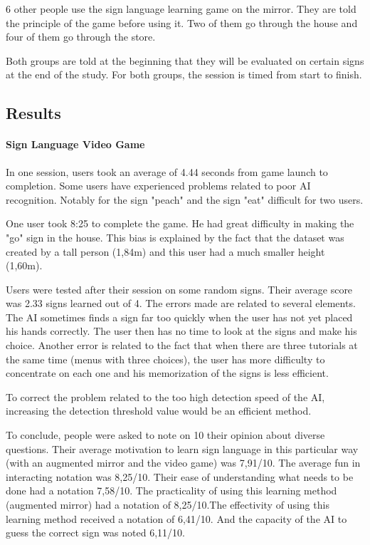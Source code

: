 6 other people use the sign language learning game on the mirror. They are told the principle of the game before using it. Two of them go through the house and four of them go through the store.

Both groups are told at the beginning that they will be evaluated on certain signs at the end of the study. 
For both groups, the session is timed from start to finish.

\subsection{Results}

\paragraph{Sign Language Video Game}

In one session, users took an average of 4.44 seconds from game launch to completion. Some users have experienced problems related to poor AI recognition.
Notably for the sign "peach" and the sign "eat" difficult for two users.

One user took 8:25 to complete the game. He had great difficulty in making the "go" sign in the house. This bias is explained by the fact that the dataset was created by a tall person (1,84m) and this user had a much smaller height (1,60m). 

Users were tested after their session on some random signs. Their average score was 2.33 signs learned out of 4. The errors made are related to several elements. The AI sometimes finds a sign far too quickly when the user has not yet placed his hands correctly. The user then has no time to look at the signs and make his choice. Another error is related to the fact that when there are three tutorials at the same time (menus with three choices), the user has more difficulty to concentrate on each one and his memorization of the signs is less efficient.

To correct the problem related to the too high detection speed of the AI, increasing the detection threshold value would be an efficient method.

To conclude, people were asked to note on 10 their opinion about diverse questions. Their average motivation to learn sign language in this particular way (with an augmented mirror and the video game) was 7,91/10.
The average fun in interacting notation was 8,25/10. Their ease of understanding what needs to be done had a notation 7,58/10. The practicality of using this learning method (augmented mirror) had a notation of 8,25/10.The effectivity of using this learning method received a notation of 6,41/10. And the capacity of the AI to guess the correct sign was noted 6,11/10.

